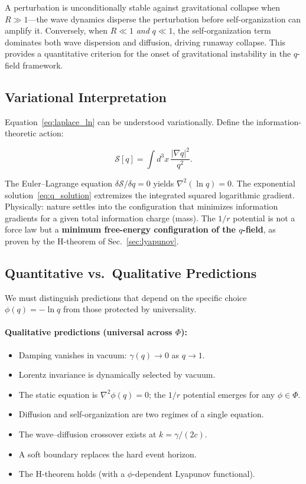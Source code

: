 \documentclass[aps,prd,twocolumn,showpacs,superscriptaddress,preprintnumbers]{revtex4-2}
\begin{document}
A perturbation is unconditionally stable against gravitational collapse when $R\gg1$---the wave dynamics disperse the perturbation before self-organization can amplify it.
Conversely, when $R\ll1$ \emph{and} $q\ll1$, the self-organization term dominates both wave dispersion and diffusion, driving runaway collapse.
This provides a quantitative criterion for the onset of gravitational instability in the $q$-field framework.

\subsection{Variational Interpretation}

Equation~\eqref{eq:laplace_ln} can be understood variationally.
Define the information-theoretic action:

\begin{equation}
\mathcal{S}[q] = \int d^3x \, \frac{|\nabla q|^2}{q^2}.
\label{eq:action}
\end{equation}

The Euler--Lagrange equation $\delta\mathcal{S}/\delta q=0$ yields $\nabla^2(\ln q)=0$.
The exponential solution~\eqref{eq:q_solution} extremizes the integrated squared logarithmic gradient.
Physically: nature settles into the configuration that minimizes information gradients for a given total information charge (mass).
The $1/r$ potential is not a force law but a \textbf{minimum free-energy configuration of the $q$-field}, as proven by the H-theorem of Sec.~\ref{sec:lyapunov}.

\subsection{Quantitative vs.\ Qualitative Predictions}
\label{sec:qual_vs_quant}

We must distinguish predictions that depend on the specific choice $\phi(q)=-\ln q$ from those protected by universality.

\paragraph{Qualitative predictions (universal across $\Phi$):}
\begin{itemize}
    \item Damping vanishes in vacuum: $\gamma(q)\to0$ as $q\to1$.
    \item Lorentz invariance is dynamically selected by vacuum.
    \item The static equation is $\nabla^2\phi(q)=0$; the $1/r$ potential emerges for any $\phi\in\Phi$.
    \item Diffusion and self-organization are two regimes of a single equation.
    \item The wave--diffusion crossover exists at $k=\gamma/(2c)$.
    \item A soft boundary replaces the hard event horizon.
    \item The H-theorem holds (with a $\phi$-dependent Lyapunov functional).
\end{itemize}
\end{document}

